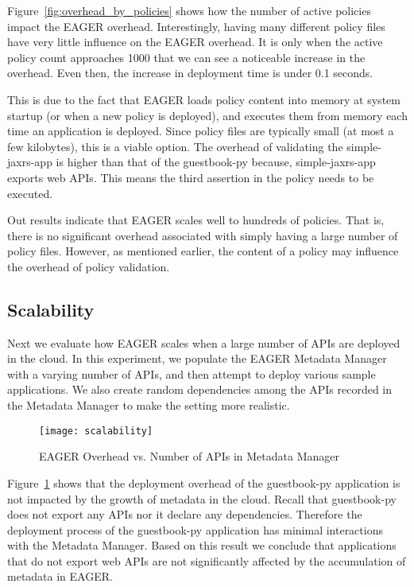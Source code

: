 Figure~\ref{fig:overhead_by_policies} shows how the number of active policies impact the EAGER overhead. Interestingly, having many
different policy files have very little influence on the EAGER overhead. It is only when the active policy count approaches 1000 that we
can see a noticeable increase in the overhead. Even then, the increase in deployment time is under 0.1 seconds. 

This is due to the fact that EAGER loads policy content into memory at system
startup (or when a new policy is deployed), and executes them from memory each time an application is deployed. Since policy files are 
typically small (at most a few kilobytes), this is a viable option. The overhead of validating the simple-jaxrs-app is higher than that of the
guestbook-py because, simple-jaxrs-app exports web APIs. This means the third assertion in the policy
needs to be executed. 

Out results indicate that EAGER scales well to hundreds of policies. That is, there is no significant overhead associated with simply having
a large number of policy files. However, as mentioned earlier, the content of a policy may influence the overhead of policy validation.
 
\subsection{Scalability}
Next we evaluate how EAGER scales when a large number of APIs are deployed in the cloud. In this experiment, we populate the EAGER
Metadata Manager with a varying number of APIs, and then attempt to deploy various sample applications. We also create
random dependencies among the APIs recorded in the Metadata Manager to make the setting more realistic.

\begin{figure}
\centering
\texttt{[image: scalability]}
\caption{EAGER Overhead vs. Number of APIs in Metadata Manager}
\label{fig:scalability}
\end{figure}

Figure~\ref{fig:scalability} shows that the deployment overhead of the guestbook-py application is not impacted by the growth of metadata
in the cloud. Recall that guestbook-py does not export any APIs nor it declare any dependencies. Therefore the deployment process of
the guestbook-py application has minimal interactions with the Metadata Manager. Based on this result we conclude that applications that
do not export web APIs are not significantly affected by the accumulation of metadata in EAGER.


